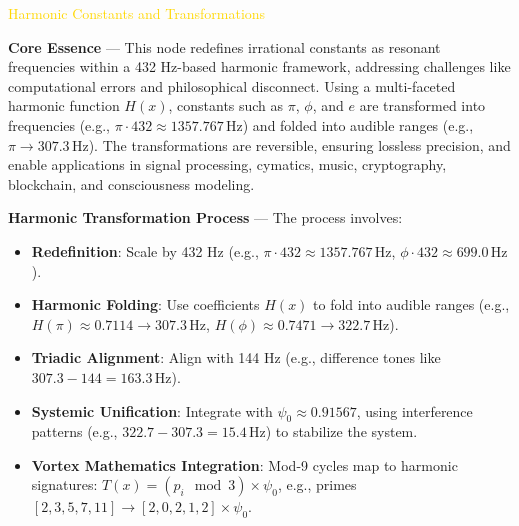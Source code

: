 \textcolor{gold}{ Harmonic Constants and Transformations }

\textbf{Core Essence} --- This node redefines irrational constants as resonant frequencies within a 432 Hz-based harmonic framework, addressing challenges like computational errors and philosophical disconnect. Using a multi-faceted harmonic function \(H(x)\), constants such as \(\pi\), \(\phi\), and \(e\) are transformed into frequencies (e.g., \(\pi \cdot 432 \approx 1357.767 \, \text{Hz}\)) and folded into audible ranges (e.g., \(\pi \rightarrow 307.3 \, \text{Hz}\)). The transformations are reversible, ensuring lossless precision, and enable applications in signal processing, cymatics, music, cryptography, blockchain, and consciousness modeling.

\textbf{Harmonic Transformation Process} --- The process involves:
\begin{itemize}
    \item \textbf{Redefinition}: Scale by 432 Hz (e.g., \(\pi \cdot 432 \approx 1357.767 \, \text{Hz}\), \(\phi \cdot 432 \approx 699.0 \, \text{Hz}\)).
    \item \textbf{Harmonic Folding}: Use coefficients \(H(x)\) to fold into audible ranges (e.g., \(H(\pi) \approx 0.7114 \rightarrow 307.3 \, \text{Hz}\), \(H(\phi) \approx 0.7471 \rightarrow 322.7 \, \text{Hz}\)).
    \item \textbf{Triadic Alignment}: Align with 144 Hz (e.g., difference tones like \(307.3 - 144 = 163.3 \, \text{Hz}\)).
    \item \textbf{Systemic Unification}: Integrate with \(\psi_0 \approx 0.91567\), using interference patterns (e.g., \(322.7 - 307.3 = 15.4 \, \text{Hz}\)) to stabilize the system.
    \item \textbf{Vortex Mathematics Integration}: Mod-9 cycles map to harmonic signatures: \(T(x) = (p_i \mod 3) \times \psi_0\), e.g., primes \([2, 3, 5, 7, 11] \rightarrow [2, 0, 2, 1, 2] \times \psi_0\).
\end{itemize}

